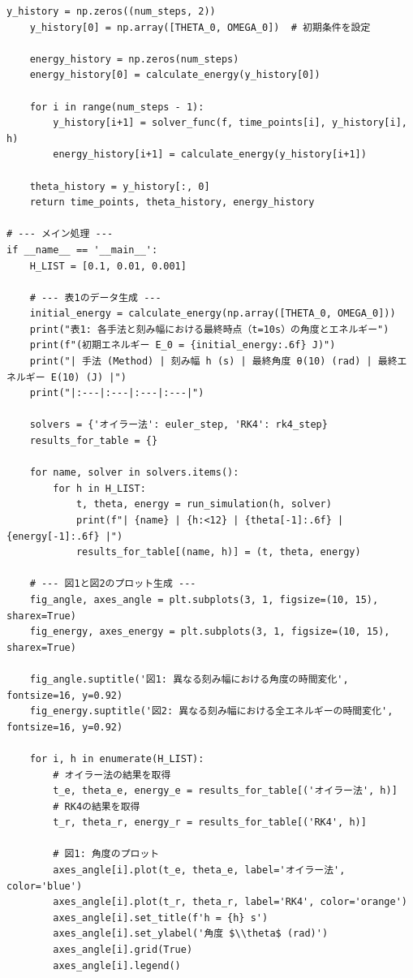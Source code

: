 \documentclass{article}
\begin{document}
\begin{lstlisting}[caption={Python code used for numerical experiments, tables, and graphs in this study}, label={lst:code}]
    y_history = np.zeros((num_steps, 2))
    y_history[0] = np.array([THETA_0, OMEGA_0])  # 初期条件を設定
    
    energy_history = np.zeros(num_steps)
    energy_history[0] = calculate_energy(y_history[0])
    
    for i in range(num_steps - 1):
        y_history[i+1] = solver_func(f, time_points[i], y_history[i], h)
        energy_history[i+1] = calculate_energy(y_history[i+1])
        
    theta_history = y_history[:, 0]
    return time_points, theta_history, energy_history

# --- メイン処理 ---
if __name__ == '__main__':
    H_LIST = [0.1, 0.01, 0.001]
    
    # --- 表1のデータ生成 ---
    initial_energy = calculate_energy(np.array([THETA_0, OMEGA_0]))
    print("表1: 各手法と刻み幅における最終時点（t=10s）の角度とエネルギー")
    print(f"(初期エネルギー E_0 = {initial_energy:.6f} J)")
    print("| 手法 (Method) | 刻み幅 h (s) | 最終角度 θ(10) (rad) | 最終エネルギー E(10) (J) |")
    print("|:---|:---|:---|:---|")
    
    solvers = {'オイラー法': euler_step, 'RK4': rk4_step}
    results_for_table = {}

    for name, solver in solvers.items():
        for h in H_LIST:
            t, theta, energy = run_simulation(h, solver)
            print(f"| {name} | {h:<12} | {theta[-1]:.6f} | {energy[-1]:.6f} |")
            results_for_table[(name, h)] = (t, theta, energy)

    # --- 図1と図2のプロット生成 ---
    fig_angle, axes_angle = plt.subplots(3, 1, figsize=(10, 15), sharex=True)
    fig_energy, axes_energy = plt.subplots(3, 1, figsize=(10, 15), sharex=True)
    
    fig_angle.suptitle('図1: 異なる刻み幅における角度の時間変化', fontsize=16, y=0.92)
    fig_energy.suptitle('図2: 異なる刻み幅における全エネルギーの時間変化', fontsize=16, y=0.92)

    for i, h in enumerate(H_LIST):
        # オイラー法の結果を取得
        t_e, theta_e, energy_e = results_for_table[('オイラー法', h)]
        # RK4の結果を取得
        t_r, theta_r, energy_r = results_for_table[('RK4', h)]
        
        # 図1: 角度のプロット
        axes_angle[i].plot(t_e, theta_e, label='オイラー法', color='blue')
        axes_angle[i].plot(t_r, theta_r, label='RK4', color='orange')
        axes_angle[i].set_title(f'h = {h} s')
        axes_angle[i].set_ylabel('角度 $\\theta$ (rad)')
        axes_angle[i].grid(True)
        axes_angle[i].legend()
        

\end{lstlisting}
\end{document}
